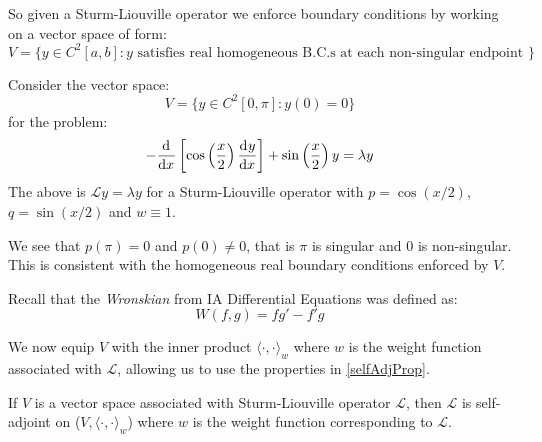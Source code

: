 \documentclass[../main.tex]{subfiles}
\begin{document}
So given a Sturm-Liouville operator we enforce boundary conditions by working on a vector space of form:
\[
  V = \{y \in C^2[a, b]: y \text{ satisfies real homogeneous B.C.s at each non-singular endpoint }\}
\]
\begin{example}
  Consider the vector space:
  \[
    V = \{y \in C^2[0, \pi]: y(0) = 0\}
  \]
  for the problem:
  \[
    -\deriv{}{x}\left[\cos\left(\frac{x}{2}\right) \deriv{y}{x}\right] + \sin\left(\frac{x}{2}\right)y = \lambda y
  \]
  The above is $\mathcal{L} y = \lambda y$ for a Sturm-Liouville operator with $p = \cos\left(x/2\right)$, $q = \sin(x/2)$ and $w \equiv 1$.

  We see that $p(\pi) = 0$ and $p(0) \neq 0$, that is $\pi$ is singular and $0$ is non-singular.
  This is consistent with the homogeneous real boundary conditions enforced by $V$.
\end{example}
\begin{remark}[Recap]
  Recall that the \textit{Wronskian} from IA Differential Equations was defined as:
  \[
    W(f, g) = fg' - f'g
  \]
\end{remark}
We now equip $V$ with the inner product $\langle \cdot, \cdot \rangle_{w}$ where $w$ is the weight function associated with $\mathcal{L}$, allowing us to use the properties in \cref{selfAdjProp}.
\begin{proposition}
  If $V$ is a vector space associated with Sturm-Liouville operator $\mathcal{L}$, then $\mathcal{L}$ is self-adjoint on ($V, \langle \cdot, \cdot \rangle_{w}$) where $w$ is the weight function corresponding to $\mathcal{L}$. \label{LSelfAdj}
\end{proposition}
\end{document}
